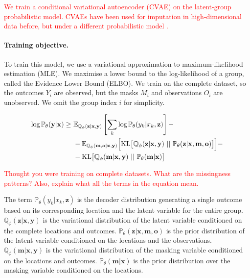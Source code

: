 \documentclass[a4paper,12pt,twoside,openright]{report}
\newcommand{\crit}[1]{\textcolor{red}{#1}}
\begin{document}
\crit{We train a conditional variational autoencoder (CVAE) on the latent-group probabilistic model. CVAEs have been used for imputation in high-dimensional data before, but under a different probabilistic model \parencite{nazabalHandlingIncompleteHeterogeneous2020, garneloConditionalNeuralProcesses2018}.}

\paragraph{Training objective.} To train this model, we use a variational approximation to maximum-likelihood estimation (MLE). We maximise a lower bound to the log-likelihood of a group, called the Evidence Lower Bound (ELBO). We train on the complete dataset, so the outcomes $Y_i$ are observed, but the masks $M_i$ and observations $O_i$ are unobserved. We omit the group index $i$ for simplicity.

\begin{align*}
    \log \mathbb{P}_\theta (\mathbf{y} | \mathbf{x}) \geq ~ & \mathbb{E}_{\mathbb{Q}_\phi (\mathbf{z} | \mathbf{x}, \mathbf{y})} \left[ \sum_k \log \mathbb{P}_\theta (y_k | x_k, \mathbf{z})\right] - \\
    & - \mathbb{E}_{\mathbb{Q}_\phi (\mathbf{m}, \mathbf{o} | \mathbf{x}, \mathbf{y})} \Bigl[ \mathrm{KL} \bigl[ \mathbb{Q}_\phi (\mathbf{z} | \mathbf{x}, \mathbf{y}) ~||~ \mathbb{P}_\theta (\mathbf{z} | \mathbf{x}, \mathbf{m}, \mathbf{o}) \bigr] \Bigr] - \\
    & - \mathrm{KL} \bigl[ \mathbb{Q}_\phi (\mathbf{m} | \mathbf{x}, \mathbf{y}) ~||~ \mathbb{P}_\theta (\mathbf{m} | \mathbf{x}) \bigr]
\end{align*}

\crit{Thought you were training on complete datasets. What are the missingness patterns? Also, explain what all the terms in the equation mean.}

The term $\mathbb{P}_\theta (y_k | x_k, \mathbf{z})$ is the decoder distribution generating a single outcome based on its corresponding location and the latent variable for the entire group. $\mathbb{Q}_\phi (\mathbf{z} | \mathbf{x}, \mathbf{y})$ is the variational distribution of the latent variable conditioned on the complete locations and outcomes. $\mathbb{P}_\theta (\mathbf{z} | \mathbf{x}, \mathbf{m}, \mathbf{o})$ is the prior distribution of the latent variable conditioned on the locations and the observations. $\mathbb{Q}_\phi (\mathbf{m} | \mathbf{x}, \mathbf{y})$ is the variational distribution of the masking variable conditioned on the locations and outcomes. $\mathbb{P}_\theta (\mathbf{m} | \mathbf{x})$ is the prior distribution over the masking variable conditioned on the locations.
\end{document}

